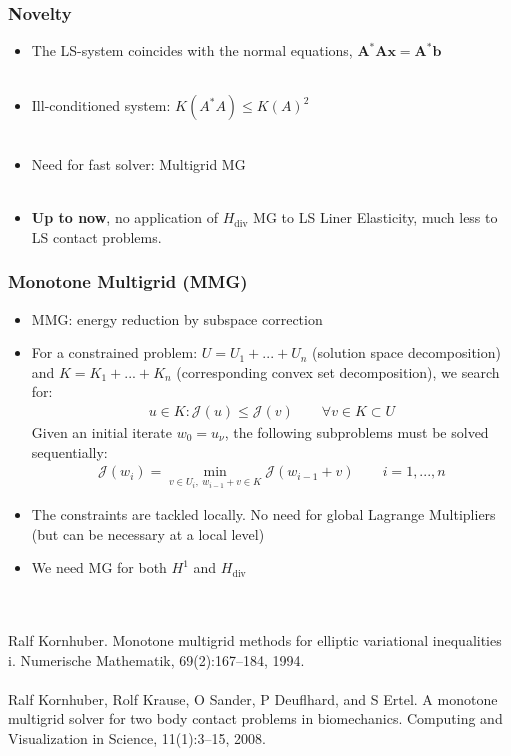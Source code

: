 \documentclass[8pt, oneside]{beamer}   	%
\newcommand{\bA}{\textbf{A}}
\newcommand{\bb}{\textbf{b}}
\newcommand{\bbx}{\textbf{x}}
\begin{document}
\begin{frame}
\frametitle{\textbf{Novelty}}
\begin{itemize}
\item The LS-system coincides with the normal equations, $\bA^* \bA \bbx =\bA^* \bb$ \\
${}$
\item Ill-conditioned system: $K(A^* A) \leq K(A)^2$ \\
${}$
\item Need for fast solver: Multigrid MG \\
${}$
\item \textbf{Up to now}, no application of $H_{\text{div}}$ MG to LS Liner Elasticity, much less to LS contact problems.

\end{itemize}


\end{frame}


\begin{frame}
\frametitle{\textbf{Monotone Multigrid (MMG)}}
\begin{itemize}
\item MMG: energy reduction by subspace correction
\item  For a constrained problem: $U=U_1+...+U_n$ (solution space decomposition) and $K=K_1 +...+K_n$ (corresponding convex set decomposition), we search for:
\begin{align*}
u \in K : \mathcal{J}(u) \leq \mathcal{J}(v) \qquad \forall v \in K \subset U
\end{align*}
Given an initial iterate $w_0=u_{\nu}$, the following subproblems must be solved sequentially:
\begin{align*}
\mathcal{J}(w_i) =\min \limits_{v \in U_i, \:  w_{i-1}+v \in K } \mathcal{J}(w_{i-1}+v)   \qquad i=1,...,n
\end{align*}
\item The constraints are tackled locally. No need for global Lagrange Multipliers (but can be necessary at a local level)
\item We need MG for both $H^1$ and $H_{\text{div}}$
\end{itemize}
${}$\\
${}$\\
\footnotesize{Ralf Kornhuber. Monotone multigrid methods for elliptic variational inequalities i. Numerische Mathematik, 69(2):167–184, 1994.}
${}$\\${}$\\
\footnotesize{Ralf Kornhuber, Rolf Krause, O Sander, P Deuflhard, and S Ertel. A monotone multigrid solver for two body contact problems in biomechanics. Computing and Visualization in Science, 11(1):3–15, 2008.}


\end{frame}
\end{document}
